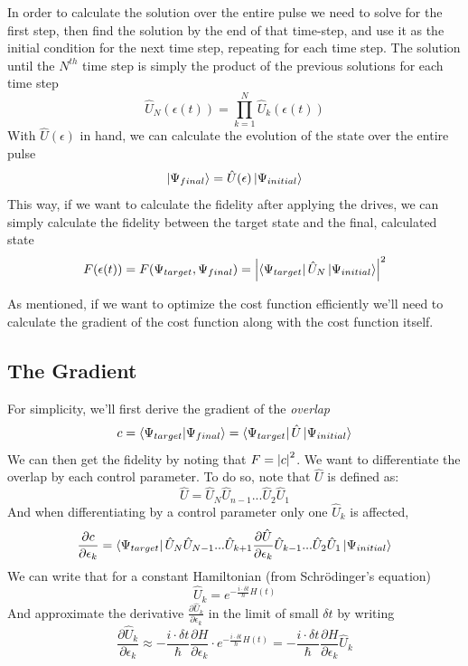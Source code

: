 In order to calculate the solution over the entire pulse we need to solve for the first step, then find the solution by the end of that time-step, and use it as the initial condition for the next time step, repeating for each time step. The solution until the $N^{th}$ time step is simply the product of the previous solutions for each time step
\begin{equation}\label{eq:U_def_prod}
\hat{U}_N (\epsilon (t)) = \prod_{k = 1}^N\hat{U}_k (\epsilon (t))
\end{equation}
With $\hat{U} (\epsilon)$ in hand, we can calculate the evolution of the state over the entire pulse
\begin{equation}
\ket{\Psi_{final}} = \hat{U} (\epsilon)\ket{\Psi_{initial}}
\end{equation}
This way, if we want to calculate the fidelity after applying the drives, we can simply calculate the fidelity between the target state and the final, calculated state
\begin{equation} \label{eq:fidelity_sim}
F (\epsilon (t)) = F (\Psi_{target}, \Psi_{final}) = \abs{\bra{\Psi_{target}}\hat{U}_N\ket{\Psi_{initial}}}^2
\end{equation}

As mentioned, if we want to optimize the cost function efficiently we'll need to calculate the gradient of the cost function along with the cost function itself.

\subsection{The Gradient}
For simplicity, we'll first derive the gradient of the \textit{overlap}
\begin{equation} \label{def:overlap}
c = \braket{\Psi_{target}}{\Psi_{final}} = \bra{\Psi_{target}}\hat{U}\ket{\Psi_{initial}}
\end{equation}
We can then get the fidelity by noting that $F = \abs{c}^2$. We want to differentiate the overlap by each control parameter. To do so, note that $\hat{U}$ is defined as:
\[ 
\hat{U} = \hat{U}_N \hat{U}_{n-1}...\hat{U}_2 \hat{U}_1
\]
And when differentiating by a control parameter only one $\hat{U}_k$ is affected,
\[
\frac{\partial c}{\partial \epsilon_k} = \bra{\Psi_{target}}\hat{U}_N \hat{U}_{N-1} ... \hat{U}_{k+1}\frac{\partial \hat{U}}{\partial \epsilon_k} \hat{U}_{k-1} ...\hat{U}_2 \hat{U}_1\ket{\Psi_{initial}} 
\]
We can write that for a constant Hamiltonian (from Schr\"{o}dinger's equation)
\[
    \hat{U}_k = e^{-\frac{i\cdot \delta t}{\hbar}H (t)}
\]
And approximate the derivative $\frac{\partial \hat{U}_k}{\partial \epsilon_k}$ in the limit of small $\delta t$ by writing
\begin{equation*}
    \frac{\partial \hat{U}_k}{\partial \epsilon_k} \approx -\frac{i\cdot \delta t}{\hbar}\frac{\partial H}{\partial \epsilon_k} \cdot e^{-\frac{i\cdot \delta t}{\hbar}H (t)} = -\frac{i\cdot \delta t}{\hbar}\frac{\partial H}{\partial \epsilon_k} \hat{U}_k
\end{equation*}

